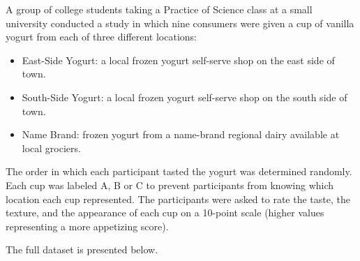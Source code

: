 \documentclass[]{book}
\providecommand{\tightlist}{%
  \setlength{\itemsep}{0pt}\setlength{\parskip}{0pt}}
\theoremstyle{plain}
\theoremstyle{mydefn}
\theoremstyle{myexmpl}
\theoremstyle{remark}
\begin{document}
A group of college students taking a Practice of Science class at a
small university conducted a study in which nine consumers were given a
cup of vanilla yogurt from each of three different locations:

\begin{itemize}
\tightlist
\item
  East-Side Yogurt: a local frozen yogurt self-serve shop on the east
  side of town.
\item
  South-Side Yogurt: a local frozen yogurt self-serve shop on the south
  side of town.
\item
  Name Brand: frozen yogurt from a name-brand regional dairy available
  at local grociers.
\end{itemize}

The order in which each participant tasted the yogurt was determined
randomly. Each cup was labeled A, B or C to prevent participants from
knowing which location each cup represented. The participants were asked
to rate the taste, the texture, and the appearance of each cup on a
10-point scale (higher values representing a more appetizing score).

The full dataset is presented below.
\end{document}
